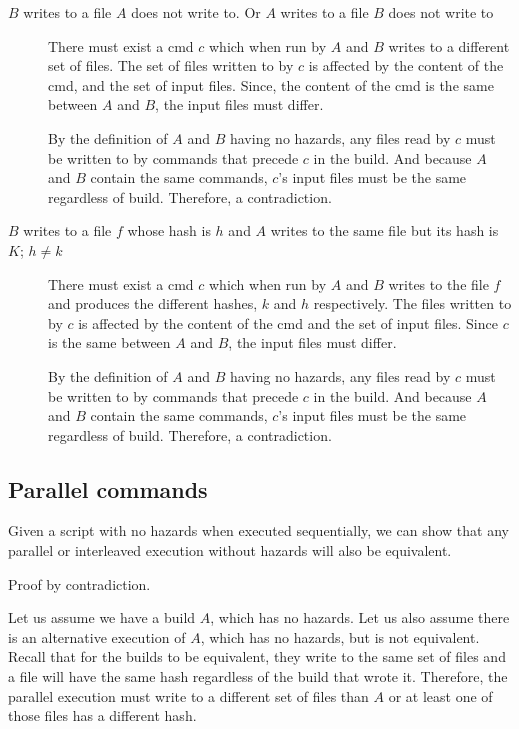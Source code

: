 \begin{description}
\item [$B$ writes to a file $A$ does not write to. Or $A$ writes to a file $B$ does not write to]
  There must exist a cmd $c$ which when run by $A$ and $B$ writes to a different set of files.  The set of files written to by $c$ is affected by the content of the cmd, and the set of input files.  Since, the content of the cmd is the same between $A$ and $B$, the input files must differ.

  By the definition of $A$ and $B$ having no hazards, any files read by $c$ must be written to by commands that precede $c$ in the build. And because $A$ and $B$ contain the same commands, $c$'s input files must be the same regardless of build.  Therefore, a contradiction.

\item [$B$ writes to a file $f$ whose hash is $h$ and $A$ writes to the same file but its hash is $K$; $h \neq k$]
  There must exist a cmd $c$ which when run by $A$ and $B$ writes to the file $f$ and produces the different hashes, $k$ and $h$ respectively.  The files written to by $c$ is affected by the content of the cmd and the set of input files. Since $c$ is the same between $A$ and $B$, the input files must differ.

  By the definition of $A$ and $B$ having no hazards, any files read by $c$ must be written to by commands that precede $c$ in the build.  And because $A$ and $B$ contain the same commands, $c$'s input files must be the same regardless of build.  Therefore, a contradiction.
  
\end{description}

\subsection{Parallel commands}
\label{sec:proof:parallel}

Given a script with no hazards when executed sequentially, we can show that any parallel or interleaved execution without hazards will also be equivalent.

Proof by contradiction.

Let us assume we have a build $A$, which has no hazards.  Let us also assume there is an alternative execution of $A$, which has no hazards, but is not equivalent.
Recall that for the builds to be equivalent, they write to the same set of files and a file will have the same hash regardless of the build that wrote it.
Therefore, the parallel execution must write to a different set of files than $A$ or at least one of those files has a different hash.

